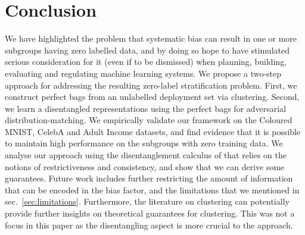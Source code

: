 %
%
%
%
%
\section{Conclusion}
We have highlighted the problem that systematic bias can result in one or more subgroups having zero labelled data, and by doing so hope to have stimulated serious consideration for it (even if to be dismissed) when planning, building, evaluating and regulating machine learning systems.
We propose a two-step approach for addressing the resulting zero-label stratification problem.
First, we construct perfect bags from an unlabelled deployment set via  clustering. 
Second, we learn a disentangled representations using the perfect bags for adversarial distribution-matching. 
We empirically validate our framework on the Coloured MNIST, CelebA and Adult Income datasets, and find evidence that it is possible to maintain high performance on the subgroups with zero training data. 
We analyse our approach using the disentanglement calculus of \citet{ShuCheKumErmetal20} that relies on the notions of restrictiveness and consistency, and show that we can derive some guarantees.
Future work includes further restricting the amount of information that can be encoded in the bias factor, and the limitations that we mentioned in sec.~\ref{sec:limitations}.
Furthermore, the literature on clustering can potentially provide further insights on theoretical guarantees for clustering. This was not a focus in this paper as the disentangling aspect is more crucial to the approach.

